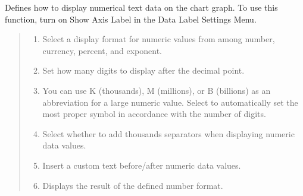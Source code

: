 \documentclass[letterpaper,10pt,english]{sphinxmanual}
\begin{document}

Defines how to display numerical text data on the chart graph. To use this function, turn on Show Axis Label in the Data Label Settings Menu.
\begin{quote}

\begin{figure}[H]
\centering

\noindent{}
\end{figure}
\begin{enumerate}
\def\theenumi{\arabic{enumi}}
\def\labelenumi{\theenumi .}
\makeatletter\def\p@enumii{\p@enumi \theenumi .}\makeatother
\item {} 
 Select a display format for numeric values from among number, currency, percent, and exponent.

\item {} 
 Set how many digits to display after the decimal point.

\item {} 
 You can use K (thousands), M (millions), or B (billions) as an abbreviation for a large numeric value. Select  to automatically set the most proper symbol in accordance with the number of digits.

\item {} 
 Select whether to add thousands separators when displaying numeric data values.

\item {} 
 Insert a custom text before/after numeric data values.

\item {} 
 Displays the result of the defined number format.

\end{enumerate}
\end{quote}

\end{document}
